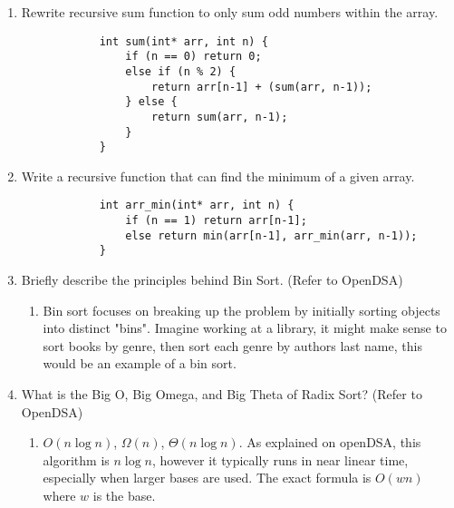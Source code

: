 \documentclass[11pt]{article}
\begin{document}
    \begin{enumerate}
        \item Rewrite recursive sum function to only sum odd numbers within the array.
        \begin{lstlisting}
            int sum(int* arr, int n) {
                if (n == 0) return 0;
                else if (n % 2) {
                    return arr[n-1] + (sum(arr, n-1));
                } else {
                    return sum(arr, n-1);
                }
            }
        \end{lstlisting}
        \item Write a recursive function that can find the minimum of a given array.
        \begin{lstlisting}
            int arr_min(int* arr, int n) {
                if (n == 1) return arr[n-1];
                else return min(arr[n-1], arr_min(arr, n-1));
            }
        \end{lstlisting}
        \item Briefly describe the principles behind Bin Sort. (Refer to OpenDSA)
        \begin{enumerate}
            \item Bin sort focuses on breaking up the problem by initially sorting objects into distinct "bins". Imagine working at a library, it might make sense to sort books by genre, then sort each genre by authors last name, this would be an example of a bin sort.
        \end{enumerate}
        \item What is the Big O, Big Omega, and Big Theta of Radix Sort? (Refer to OpenDSA)
        \begin{enumerate}
            \item $O(n \log n)$, $\Omega(n)$, $\Theta(n \log n)$. As explained on openDSA, this algorithm is $n \log n$, however it typically runs in near linear time, especially when larger bases are used. The exact formula is $O(wn)$ where $w$ is the base.
        \end{enumerate}
    \end{enumerate}
    
    \label{r:lastpage}
    
    
\end{document}
